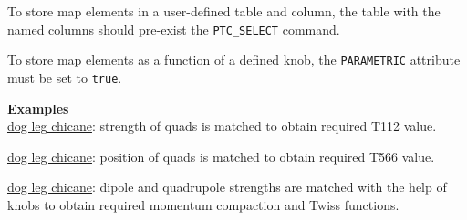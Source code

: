 To store map elements in a user-defined table and column, the table with the
named columns should pre-exist the \texttt{PTC\_SELECT} command.

To store map elements as a function of a defined knob, the
\texttt{PARAMETRIC} attribute must be set to \texttt{true}.


\textbf{Examples}\\

\href{http://cern.ch/frs/mad-X_examples/ptc_madx_interface/ptc_secordmatch/chicane.madx}{dog
  leg chicane}: strength of quads is matched to obtain required T112
value.

\href{http://cern.ch/frs/mad-X_examples/ptc_madx_interface/eplacement/chicane.madx}{dog
  leg chicane}: position of quads is matched to obtain required T566
value.

\href{http://cern.ch/frs/mad-X_examples/ptc_madx_interface/matchwithknobs/matchwithknobs.madx}{dog
  leg chicane}: dipole and quadrupole strengths are matched with the
help of knobs to obtain required momentum compaction and Twiss
functions.








